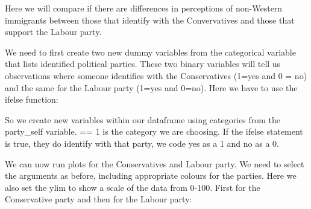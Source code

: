 \documentclass[]{article}
\newenvironment{Shaded}{\begin{snugshade}}{\end{snugshade}}
\newcommand{\DataTypeTok}[1]{\textcolor[rgb]{0.13,0.29,0.53}{#1}}
\newcommand{\DecValTok}[1]{\textcolor[rgb]{0.00,0.00,0.81}{#1}}
\newcommand{\KeywordTok}[1]{\textcolor[rgb]{0.13,0.29,0.53}{\textbf{#1}}}
\newcommand{\NormalTok}[1]{#1}
\newcommand{\OperatorTok}[1]{\textcolor[rgb]{0.81,0.36,0.00}{\textbf{#1}}}
\newcommand{\StringTok}[1]{\textcolor[rgb]{0.31,0.60,0.02}{#1}}
\begin{document}
Here we will compare if there are differences in perceptions of non-Western immigrants between those that identify with the Convervatives and those that support the Labour party.

We need to first create two new dummy variables from the categorical variable that lists identified political parties. These two binary variables will tell us observations where someone identifies with the Conservatives (1=yes and 0 = no) and the same for the Labour party (1=yes and 0=no). Here we have to use the ifelse function:

\begin{Shaded}
\end{Shaded}

So we create new variables within our dataframe using categories from the party\_self variable. == 1 is the category we are choosing. If the ifelse statement is true, they do identify with that party, we code yes as a 1 and no as a 0.

We can now run plots for the Conservatives and Labour party. We need to select the arguments as before, including appropriate colours for the parties. Here we also set the ylim to show a scale of the data from 0-100. First for the Conservative party and then for the Labour party:
\end{document}
